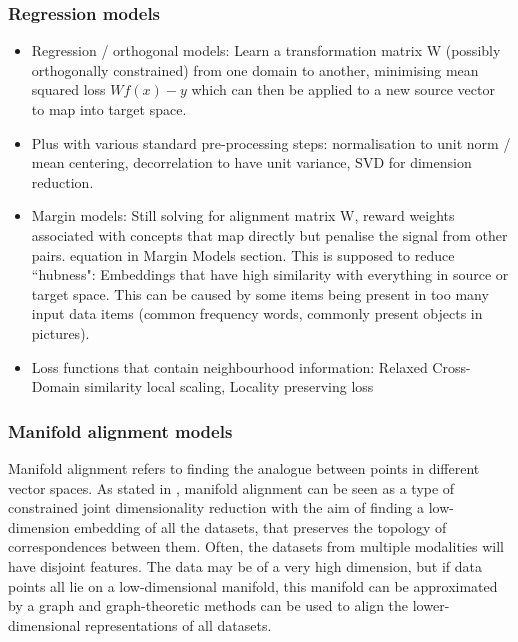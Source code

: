 \subsubsection{Regression models}
\begin{itemize}
        \item Regression / orthogonal models: \cite{kalinowski2020survey} Learn a transformation matrix W (possibly orthogonally constrained) from one domain to another, minimising mean squared loss $Wf(x) - y$ which can then be applied to a new source vector to map into target space. 
        \item Plus with various standard pre-processing steps: normalisation to unit norm / mean centering, decorrelation to have unit variance, SVD for dimension reduction. 
        \item Margin models: Still solving for alignment matrix W, reward weights associated with concepts that map directly but penalise the signal from other pairs. \cite{kalinowski2020survey} equation in Margin Models section. This is supposed to reduce ``hubness": Embeddings that have high similarity with everything in source or target space. This can be caused by some items being present in too many input data items (common frequency words, commonly present objects in pictures). 
        \item Loss functions that contain neighbourhood information: Relaxed Cross-Domain similarity local scaling, Locality preserving loss 
\end{itemize}

\subsubsection{Manifold alignment models}
Manifold alignment refers to finding the analogue between points in different vector spaces. As stated in \cite{ManifoldLearningTheoryAndApplications}, manifold alignment can be seen as a type of constrained joint dimensionality reduction with the aim of finding a low-dimension embedding of all the datasets, that preserves the topology of correspondences between them. Often, the datasets from multiple modalities will have disjoint features. The data may be of a very high dimension, but if data points all lie on a low-dimensional manifold, this manifold can be approximated by a graph and graph-theoretic methods can be used to align the lower-dimensional representations of all datasets. 

